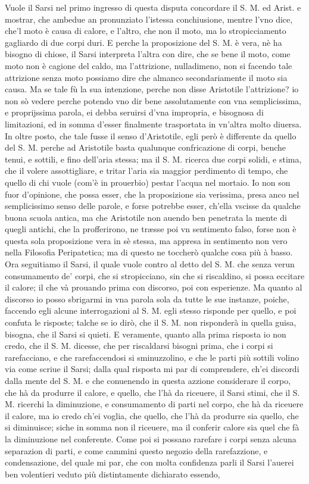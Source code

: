 \documentclass[11pt,twoside,openany]{book}
\begin{document}
Vuole il Sarsi nel primo ingresso di questa disputa concordare il S. M. ed Arist. e mostrar, che ambedue an pronunziato l'istessa conchiusione, mentre l'vno dice, che'l moto è causa di calore, e l'altro, che non il moto, ma lo stropicciamento gagliardo di due corpi duri. E perche la proposizione del S. M. è vera, nè ha bisogno di chiose, il Sarsi interpreta l'altra con dire, che se bene il moto, come moto non è cagione del caldo, ma l'attrizione, nulladimeno, non si facendo tale attrizione senza moto possiamo dire che almanco secondariamente il moto sia causa. Ma se tale fù la sua intenzione, perche non disse Aristotile l'attrizione? io non sò vedere perche potendo vno dir bene assolutamente con vna semplicissima, e proprijssima parola, ei debba seruirsi d'vna impropria, e bisognosa di limitazioni, ed in somma d'esser finalmente trasportata in vn'altra molto diuersa. In oltre posto, che tale fusse il senso d'Aristotile, egli però è differente da quello del S. M. perche ad Aristotile basta qualunque confricazione di corpi, benche tenui, e sottili, e fino dell'aria stessa; ma il S. M. ricerca due corpi solidi, e stima, che il volere assottigliare, e tritar l'aria sia maggior perdimento di tempo, che quello di chi vuole (com'è in prouerbio) pestar l'acqua nel mortaio. Io non son fuor d'opinione, che possa esser, che la proposizione sia verissima, presa anco nel semplicissimo senso delle parole, e forse potrebbe esser, ch'ella vscisse da qualche buona scuola antica, ma che Aristotile non auendo ben penetrata la mente di quegli antichi, che la profferirono, ne træsse poi vn sentimento falso, forse non è questa sola proposizione vera in sè stessa, ma appresa in sentimento non vero nella Filosofia Peripatetica; ma di questo ne toccherò qualche cosa più à basso. Ora seguitiamo il Sarsi, il quale vuole contro al detto del S. M. che senza verun consumamento de' corpi, che si stropicciano, sin che si riscaldino, si possa eccitare il calore; il che và prouando prima con discorso, poi con esperienze. Ma quanto al discorso io posso sbrigarmi in vna parola sola da tutte le sue instanze, poiche, faccendo egli alcune interrogazioni al S. M. egli stesso risponde per quello, e poi confuta le risposte; talche se io dirò, che il S. M. non risponderà in quella guisa, bisogna, che il Sarsi si quieti. E veramente, quanto alla prima risposta io non credo, che il S. M. dicesse, che per riscaldarsi bisogni prima, che i corpi si rarefacciano, e che rarefaccendosi si sminuzzolino, e che le parti più sottili volino via come scriue il Sarsi; dalla qual risposta mi par di comprendere, ch'ei discordi dalla mente del S. M. e che conuenendo in questa azzione considerare il corpo, che hà da produrre il calore, e quello, che l'hà da riceuere, il Sarsi stimi, che il S. M. ricerchi la diminuzione, e consumamento di parti nel corpo, che hà da riceuere il calore, ma io credo ch'ei voglia, che quello, che l'hà da produrre sia quello, che si diminuisce; siche in somma non il riceuere, ma il conferir calore sia quel che fà la diminuzione nel conferente. Come poi si possano rarefare i corpi senza alcuna separazion di parti, e come cammini questo negozio della rarefazzione, e condensazione, del quale mi par, che con molta confidenza parli il Sarsi l'auerei ben volentieri veduto più distintamente dichiarato essendo, 
\end{document}
